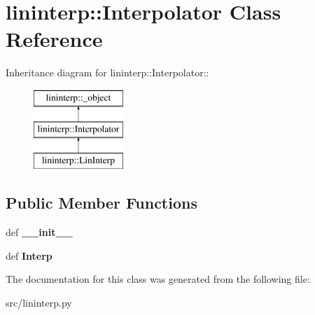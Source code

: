 \hypertarget{classlininterp_1_1Interpolator}{
\section{lininterp::Interpolator Class Reference}
\label{d4/de4/classlininterp_1_1Interpolator}
}
Inheritance diagram for lininterp::Interpolator::\begin{figure}[H]
\begin{center}
\leavevmode
\includegraphics[height=3cm]{d4/de4/classlininterp_1_1Interpolator}
\end{center}
\end{figure}
\subsection*{Public Member Functions}
\begin{DoxyCompactItemize}
\item 
\hypertarget{classlininterp_1_1Interpolator_a0c338598d52dedcaa004534838ba2073}{
def {\bfseries \_\-\_\-init\_\-\_\-}}
\label{d4/de4/classlininterp_1_1Interpolator_a0c338598d52dedcaa004534838ba2073}

\item 
\hypertarget{classlininterp_1_1Interpolator_a6a32134abe67a61c3245c704793e95af}{
def {\bfseries Interp}}
\label{d4/de4/classlininterp_1_1Interpolator_a6a32134abe67a61c3245c704793e95af}

\end{DoxyCompactItemize}


The documentation for this class was generated from the following file:\begin{DoxyCompactItemize}
\item 
src/lininterp.py\end{DoxyCompactItemize}
